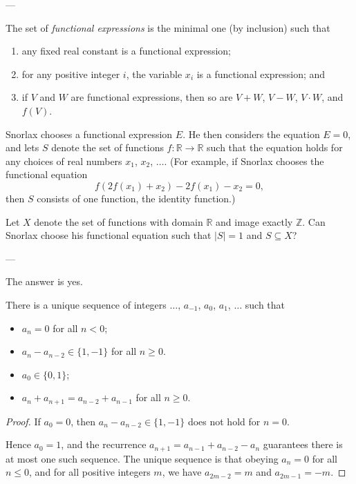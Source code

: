 
---

The set of \emph{functional expressions} is the minimal one (by inclusion) such that
\begin{enumerate}[label=(\roman*),itemsep=0em]
    \item any fixed real constant is a functional expression;
    \item for any positive integer $i$, the variable $x_i$ is a functional expression; and
    \item if $V$ and $W$ are functional expressions, then so are $V+W$, $V-W$, $V\cdot W$, and $f(V)$.
\end{enumerate}
Snorlax chooses a functional expression $E$. He then considers the equation $E=0$, and lets $S$ denote the set of functions $f:\mathbb R\to\mathbb R$ such that the equation holds for any choices of real numbers $x_1$, $x_2$, $\ldots$. (For example, if Snorlax chooses the functional equation \[f(2f(x_1)+x_2)-2f(x_1)-x_2=0,\]
then $S$ consists of one function, the identity function.)

Let $X$ denote the set of functions with domain $\mathbb R$ and image exactly $\mathbb Z$. Can Snorlax choose his functional equation such that $|S|=1$ and $S\subseteq X$?

---

The answer is yes.
\begin{iclaim*}
    There is a unique sequence of integers $\ldots$, $a_{-1}$, $a_0$, $a_1$, $\ldots$ such that
    \begin{itemize}[itemsep=0em]
    \item $a_n=0$ for all $n<0$;
    \item $a_n-a_{n-2}\in\{1,-1\}$ for all $n\ge0$.
    \item $a_0\in\{0,1\}$;
    \item $a_n+a_{n+1}=a_{n-2}+a_{n-1}$ for all $n\ge0$.
    \end{itemize}
\end{iclaim*}
\begin{proof}
    If $a_0=0$, then $a_n-a_{n-2}\in\{1,-1\}$ does not hold for $n=0$.

    Hence $a_0=1$, and the recurrence $a_{n+1}=a_{n-1}+a_{n-2}-a_n$ guarantees there is at most one such sequence. The unique sequence is that obeying $a_n=0$ for all $n\le0$, and for all positive integers $m$, we have $a_{2m-2}=m$ and $a_{2m-1}=-m$.
\end{proof}


